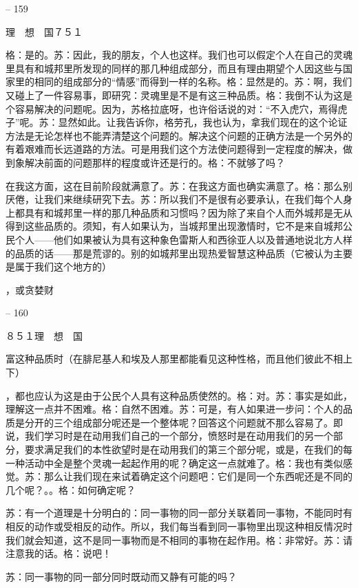 \documentclass[11pt,oneside]{book}
\begin{document}
\begin{common-format}
    

-- 159

    理　想　国７５１

    格：是的。苏：因此，我的朋友，个人也这样。我们也可以假定个人在自己的灵魂里具有和城邦里所发现的同样的那几种组成部分，而且有理由期望个人因这些与国家里的相同的组成部分的“情感”而得到一样的名称。格：显然是的。苏：啊，我们又碰上了一件容易事，即研究：灵魂里是不是有这三种品质。格：我倒不认为这是个容易解决的问题呢。因为，苏格拉底呀，也许俗话说的对：“不入虎穴，焉得虎子”呢。苏：显然如此。让我告诉你，格劳孔，我也认为，拿我们现在的这个论证方法是无论怎样也不能弄清楚这个问题的。解决这个问题的正确方法是一个另外的有着艰难而长远道路的方法。可是用我们这个方法使问题得到一定程度的解决，做到象解决前面的问题那样的程度或许还是行的。格：不就够了吗？

    在我这方面，这在目前阶段就满意了。苏：在我这方面也确实满意了。格：那么别厌倦，让我们来继续研究下去。苏：所以我们不是很有必要承认，在我们每个人身上都具有和城邦里一样的那几种品质和习惯吗？因为除了来自个人而外城邦是无从得到这些品质的。须知，有人如果认为，当城邦里出现激情时，它不是来自城邦公民个人——他们如果被认为具有这种象色雷斯人和西徐亚人以及普通地说北方人样的品质的话——那是荒谬的。别的如城邦里出现热爱智慧这种品质（它被认为主要是属于我们这个地方的）

    ，或贪婪财

    

-- 160

    ８５１理　想　国

    富这种品质时（在腓尼基人和埃及人那里都能看见这种性格，而且他们彼此不相上下）

    ，都也应认为这是由于公民个人具有这种品质使然的。格：对。苏：事实是如此，理解这一点并不困难。格：自然不困难。苏：可是，有人如果进一步问：个人的品质是分开的三个组成部分呢还是一个整体呢？回答这个问题就不那么容易了。即说，我们学习时是在动用我们自己的一个部分，愤怒时是在动用我们的另一个部分，要求满足我们的本性欲望时是在动用我们的第三个部分呢，或是，在我们的每一种活动中全是整个灵魂一起起作用的呢？确定这一点就难了。格：我也有类似感觉。苏：那么让我们现在来试着确定这个问题吧：它们是同一个东西呢还是不同的几个呢？。。格：如何确定呢？

    苏：有一个道理是十分明白的：同一事物的同一部分关联着同一事物，不能同时有相反的动作或受相反的动作。所以，我们每当看到同一事物里出现这种相反情况时我们就会知道，这不是同一事物而是不相同的事物在起作用。格：非常好。苏：请注意我的话。格：说吧！

    苏：同一事物的同一部分同时既动而又静有可能的吗？


\end{common-format}
\end{document}
